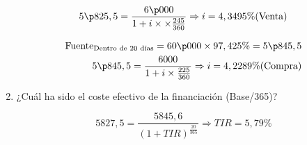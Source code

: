\begin{enumerate}[label=\textbf{\alph*)}]
    \begin{align*}
        5\p825,5 = \frac{6\p000}{1+i\times\times\frac{245}{360}} \Rightarrow i = 4,3495\% \text{(Venta)}\\
    \end{align*}

    \begin{align*}
        \text{Fuente}_{\text{Dentro de 20 días}} = 60\p000 \times 97,425\% = 5\p845,5 \\
        5\p845,5 = \frac{6000}{1+i\times \frac{225}{360}} \Rightarrow i = 4,2289\% \text{(Compra)}
    \end{align*}

    \item ¿Cuál ha sido el coste efectivo de la financiación (Base/365)?
    
    \begin{equation*}
        5827,5 = \frac{5845,6}{(1+TIR)^{\frac{20}{365}}} \Rightarrow TIR = 5,79\%
    \end{equation*}

\end{enumerate}



